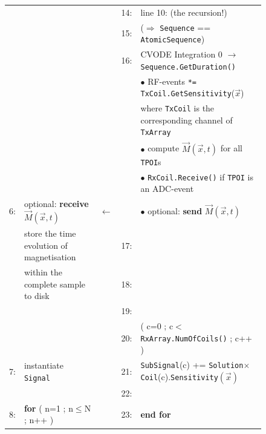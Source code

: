 \documentclass[journal,onecolumn,12pt]{IEEEtran}
\begin{document}
\begin{figure}[hbtb]
\begin{center}
{\begin{tabular}{|rlcrl|}
      &								& &	14:&\hspace*{.5cm}{\bf goto} line 10: (the recursion!)			\\
      &								& &	15:&\hspace*{.4cm}{\bf else} ($\Rightarrow$ \verb+Sequence+ == \verb+AtomicSequence+)\\
      &								& &	16:&\hspace*{.5cm}CVODE Integration 0 $\rightarrow$\verb+Sequence.GetDuration()+\\
      &								& &	   &\hspace*{.6cm}$\bullet$ RF-events \verb+*= TxCoil.GetSensitivity+($\vec{x}$)\\
      &								& &	   &\hspace*{.9cm}where \verb+TxCoil+ is the corresponding channel of \verb+TxArray+\\
      &								& &	   &\hspace*{.6cm}$\bullet$ compute $\vec{M}(\vec{x},t)$ for all \verb+TPOI+s\\
      &								& &	   &\hspace*{.6cm}$\bullet$ \verb+RxCoil.Receive()+ if \verb+TPOI+ is an ADC-event \\
    6:&optional: {\bf receive} $\vec{M}(\vec{x},t)$	&$\longleftarrow$& &\hspace*{.6cm}$\bullet$ optional: {\bf send} $\vec{M}(\vec{x},t)$   \\
      &store the time evolution of magnetisation		& &	17:&\hspace*{.4cm}{\bf end if}						\\
      &within	the complete sample to disk			& &	18:&\hspace*{.3cm}{\bf end for}						\\
      &								& &	19:&\hspace*{.2cm}{\bf end for}						\\
      &								& &	20:&\hspace*{.2cm}{\bf for} ( c=0 ; c$<$\verb+RxArray.NumOfCoils()+ ; c++ )	\\
    7:&instantiate \verb+Signal+				& &	21:&\hspace*{.3cm}\verb+SubSignal+(c) +=
									\verb+Solution+$\times$\verb+Coil+(c).\verb+Sensitivity+$(\vec{x})$\\
      &								& &	22:&\hspace*{.2cm}{\bf end for}						\\
    8:&{\bf for} ( n=1 ; n$\le$N ; n++ )			& &	23:&{\bf end for}					      		  \\

\end{tabular}}
\end{center}
\end{figure}
\end{document}
